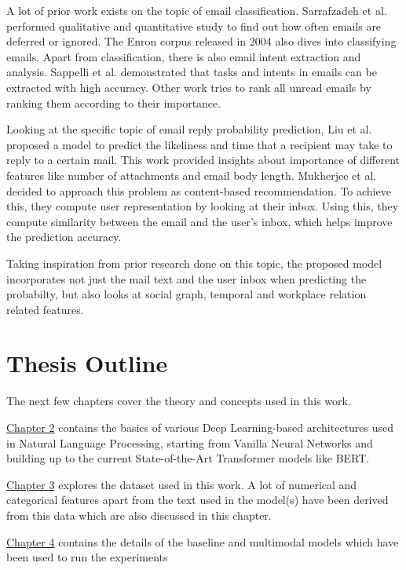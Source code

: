 A lot of prior work exists on the topic of email classification. Sarrafzadeh et al. \cite{10.1145/3289600.3291028} performed qualitative and quantitative study to find out how often emails are deferred or ignored. The Enron corpus\cite{DBLP:conf/ecml/KlimtY04} released in 2004 also dives into classifying emails. Apart from classification, there is also email intent extraction and analysis. Sappelli et al. \cite{maya_email_intent} demonstrated that tasks and intents in emails can be extracted with high accuracy. Other work tries to rank all unread emails by ranking them according to their importance\cite{36955}.  

Looking at the specific topic of email reply probability prediction, Liu et al. \cite{10.1145/3077136.3080782} proposed a model to predict the likeliness and time that a recipient may take to reply to a certain mail. This work provided insights about importance of different features like number of attachments and email body length.
Mukherjee et al. \cite{mukherjee2019contentbased} decided to approach this problem as content-based recommendation. To achieve this, they compute user representation by looking at their inbox. Using this, they compute similarity between the email and the user's inbox, which helps improve the prediction accuracy. 

Taking inspiration from prior research done on this topic, the proposed model incorporates not just the mail text and the user inbox when predicting the probabilty, but also looks at social graph, temporal and workplace relation related features.

\section{Thesis Outline}

The next few chapters cover the theory and concepts used in this work.

\hyperref[Chapter2]{Chapter 2} contains the basics of various Deep Learning-based architectures used in Natural Language Processing, starting from Vanilla Neural Networks and building up to the current State-of-the-Art Transformer models like BERT. %

\hyperref[Chapter3]{Chapter 3} explores the dataset used in this work. A lot of numerical and categorical features apart from the text used in the model(s) have been derived from this data which are also discussed in this chapter.

\hyperref[Chapter4]{Chapter 4} contains the details of the baseline and multimodal models which have been used to run the experiments

